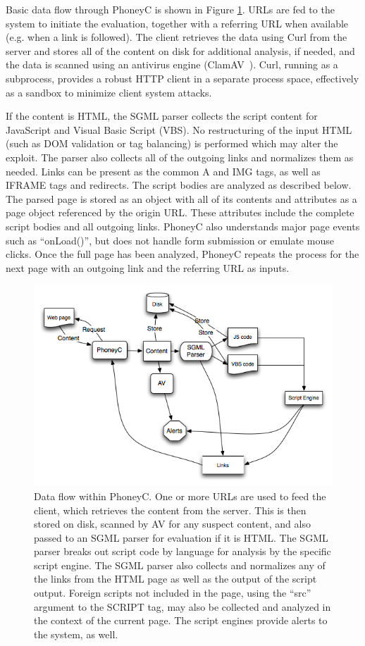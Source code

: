 \documentclass[10pt,twocolumn]{article}
\begin{document}
Basic data flow through PhoneyC is shown in Figure \ref{fig:phoneyc-flow}. URLs are fed to the system to initiate the evaluation, together with a referring URL when available (e.g. when a link is followed). The client retrieves the data using Curl from the server and stores all of the content on disk for additional analysis, if needed, and the data is scanned using an antivirus engine (ClamAV~\cite{kojm:ch}). Curl, running as a subprocess, provides a robust HTTP client in a separate process space, effectively as a sandbox to minimize client system attacks. 

If the content is HTML, the SGML parser collects the script content for JavaScript and Visual Basic Script (VBS). No restructuring of the input HTML (such as DOM validation or tag balancing) is performed which may alter the exploit. The parser also collects all of the outgoing links and normalizes them as needed. Links can be present as the common A and IMG tags, as well as IFRAME tags and redirects. The script bodies are analyzed as described below. The parsed page is stored as an object with all of its contents and attributes as a page object referenced by the origin URL. These attributes include the complete script bodies and all outgoing links. PhoneyC also understands major page events such as ``onLoad()'', but does not handle form submission or emulate mouse clicks. Once the full page has been analyzed, PhoneyC repeats the process for the next page with an outgoing link and the referring URL as inputs.

\begin{figure}[tb]
  \centering
  \includegraphics[width=\columnwidth]{pics/phoneyc_flow}
  \scriptsize
  \caption{Data flow within PhoneyC. One or more URLs are used to feed the client, which retrieves the content from the server. This is then stored on disk, scanned by AV for any suspect content, and also passed to an SGML parser for evaluation if it is HTML. The SGML parser breaks out script code by language for analysis by the specific script engine. The SGML parser also collects and normalizes any of the links from the HTML page as well as the output of the script output. Foreign scripts not included in the page, using the ``src'' argument to the SCRIPT tag, may also be collected and analyzed in the context of the current page. The script engines provide alerts to the system, as well.}
  \normalsize
  \label{fig:phoneyc-flow}
\end{figure}
\end{document}
